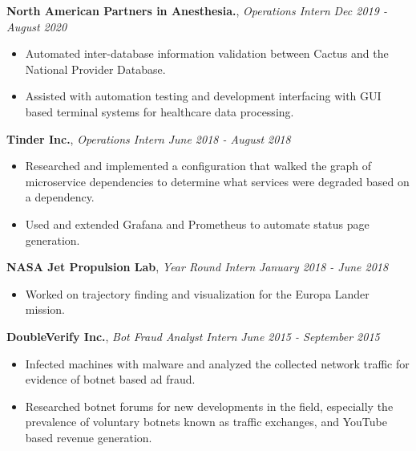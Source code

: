 \documentclass[9pt]{article}
\newenvironment{changemargin}[2]{%
  \begin{list}{}{%
    \setlength{\topsep}{0pt}%
    \setlength{\leftmargin}{#1}%
    \setlength{\rightmargin}{#2}%
    \setlength{\listparindent}{\parindent}%
    \setlength{\itemindent}{\parindent}%
    \setlength{\parsep}{\parskip}%
  }%
  \item[]}{\end{list}
}
\newenvironment{body} {
	\vspace*{-16pt}
	\begin{changemargin}{-0.25in}{-0.5in}
  }	
	{\end{changemargin}
}
\begin{document}
\begin{body}
	\textbf{North American Partners in Anesthesia.}, \emph{Operations Intern} \hfill
	\emph{Dec 2019 - August 2020}\\
	\vspace*{-3pt}
	\begin{itemize} \itemsep -0pt %
		\item Automated inter-database information validation between Cactus and the
		      National Provider Database.
		\item Assisted with automation testing and development interfacing with GUI based terminal
		      systems for healthcare data processing.
	\end{itemize}
	\vspace*{-2pt}

	\textbf{Tinder Inc.}, \emph{Operations Intern} \hfill \emph{June 2018 - August 2018}\\
	\vspace*{-3pt}
	\begin{itemize} \itemsep -0pt %
		\item Researched and implemented a configuration that walked the graph of
		microservice dependencies to determine what services were degraded based on a dependency.
		\item Used and extended Grafana and Prometheus to automate status page generation.
	\end{itemize}
	\vspace*{-2pt}


	\textbf{NASA Jet Propulsion Lab}, \emph{Year Round Intern} \hfill \emph{January 2018 - June 2018}\\
	\vspace*{-3pt}
	\begin{itemize} \itemsep -0pt %
		\item Worked on trajectory finding and visualization for the Europa Lander mission.
	\end{itemize}
	\vspace*{-2pt}

	\textbf{DoubleVerify Inc.}, \emph{Bot Fraud Analyst Intern} \hfill \emph{June 2015 - September 2015}\\
	\vspace*{-3pt}
	\begin{itemize} \itemsep -0pt %
		\item Infected machines with malware and analyzed the collected network traffic for evidence of botnet based ad fraud.
		\item Researched botnet forums for new developments in the field, especially the prevalence of voluntary botnets known as traffic exchanges, and YouTube based revenue generation.
	\end{itemize}
	\vspace*{-2pt}


\end{body}
\end{document}
